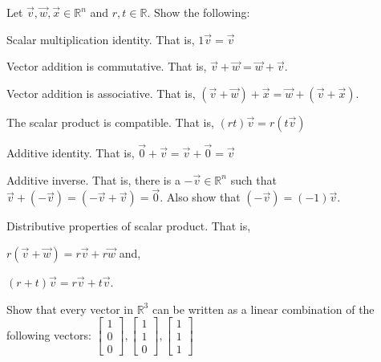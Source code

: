\begin{exercise}
Let $\vec{v},\vec{w},\vec{x} \in \mathbb{R}^n$ and $r,t \in \mathbb{R}$. Show 
the following:\\
\begin{inparaenum}[a.)]
\item Scalar multiplication identity. That is, $1 \vec{v}=\vec{v}$\\
\item Vector addition is commutative. That is, 
$\vec{v}+\vec{w}=\vec{w}+\vec{v}$.\\
\item Vector addition is associative. That is, 
$(\vec{v}+\vec{w})+\vec{x}=\vec{w}+(\vec{v}+\vec{x})$.\\
\item The scalar product is compatible. That is, $(rt) \vec{v}=r(t \vec{v})$\\
\item Additive identity. That is, $\vec{0}+\vec{v}=\vec{v}+\vec{0}=\vec{v}$\\
\item Additive inverse. That is, there is a $-\vec{v} \in \mathbb{R}^n$ such 
that $\vec{v}+(-\vec{v})=(-\vec{v}+\vec{v})=\vec{0}$. 
Also show that $(-\vec{v})=(-1)\vec{v}$. \\
\item Distributive properties of scalar product. That is, \\
\begin{inparaenum}[i.)]
\indent \item  $r(\vec{v}+\vec{w})=r\vec{v}+r\vec{w}$ and,\\
\indent \item  $(r+t)\vec{v}=r\vec{v}+t\vec{v}$.\\
\end{inparaenum}
\end{inparaenum} 
\end{exercise}


\begin{exercise}
Show that every vector in $\mathbb{R}^3$ can be written as a linear combination 
of the following vectors: $\begin{bmatrix}1\\ 0 \\ 0\end{bmatrix}, 
\begin{bmatrix}1\\ 1 \\ 0\end{bmatrix},\begin{bmatrix}1\\ 1 \\ 1\end{bmatrix}$
\end{exercise}


